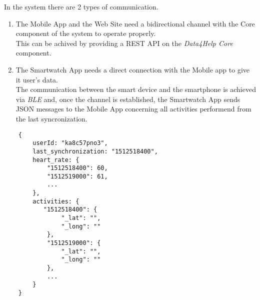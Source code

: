 
In the system there are 2 types of communication.
\begin{enumerate}
    \item The Mobile App and the Web Site need a bidirectional channel with the Core component of the system to operate properly. \\
    This can be achived by providing a REST API on the \textit{Data4Help Core} component.
    
    \item The Smartwatch App needs a direct connection with the Mobile app to give it user's data.\\ The communication between the smart device and the smartphone is achieved via \textit{BLE} and, once the channel is established, the Smartwatch App sends JSON messages to the Mobile App concerning all activities performend from the last syncronization.

\end{enumerate}
\newpage
\begin{center}
    \begin{small}
    \begin{verbatim}
    {
        userId: "ka8c57pno3",
        last_synchronization: "1512518400",
        heart_rate: {
            "1512518400": 60,
            "1512519000": 61,
            ...
        },
        activities: {
           "1512518400": {
                "_lat": "",
                "_long": ""
            },
            "1512519000": {
                "_lat": "",
                "_long": ""
            },
            ...
        }
    }
    \end{verbatim}
    \end{small}
\end{center}

